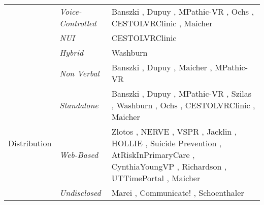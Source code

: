 \begin{table} [t]
{\begin{center}
\begin{tabular}{| p{1.8cm} | p{2cm} | p{8cm} |}
    \cline{2-3}
        & \emph{Voice-Controlled} &  Banszki \cite{banszki2018clinical,quail2016student}, Dupuy \cite{dupuy2019virtual}, MPathic-VR \cite{guetterman2019medical,kron2017using}, Ochs \cite{ochs2019training}, CESTOLVRClinic \cite{sapkaroski2018implementation}, Maicher \cite{maicher2017developing}\\
    \cline{2-3}
        & \emph{NUI} & CESTOLVRClinic \cite{sapkaroski2018implementation}\\
    \cline{2-3}
        & \emph{Hybrid} & Washburn \cite{washburn2020virtual} \\
    \cline{2-3}
        & \emph{Non Verbal} & Banszki \cite{banszki2018clinical,quail2016student}, Dupuy \cite{dupuy2019virtual}, Maicher \cite{maicher2017developing}, MPathic-VR \cite{guetterman2019medical,kron2017using}\\
    \hline
        \multirow{3}{}{Distribution} & \emph{Standalone} & Banszki \cite{banszki2018clinical,quail2016student}, Dupuy \cite{dupuy2019virtual}, MPathic-VR \cite{guetterman2019medical,kron2017using},  Szilas \cite{szilas2019virtual}, Washburn \cite{washburn2020virtual}, Ochs \cite{ochs2019training}, CESTOLVRClinic \cite{sapkaroski2018implementation}, Maicher \cite{maicher2017developing} \\
    \cline{2-3}
        & \emph{Web-Based} & Zlotos \cite{zlotos2016scenario}, NERVE
        \cite{hirumi2016advancingPart2,hirumi2016advancing,kleinsmith2015understanding}, VSPR \cite{peddle2019exploring,peddle2019development}, Jacklin \cite{jacklin2019virtual,jacklin2018improving}, HOLLIE \cite{adefila2020students}, Suicide Prevention \cite{o2019suicide}, AtRiskInPrimaryCare \cite{albright2018using}, CynthiaYoungVP \cite{foster2016using}, Richardson \cite{richardson2019virtual}, UTTimePortal \cite{zielke2016beyond,zielke2016using}, Maicher \cite{maicher2017developing} \\
    \cline{2-3}
         & \emph{Undisclosed} & Marei \cite{marei2018use}, Communicate! \cite{jeuring2015communicate}, Schoenthaler \cite{schoenthaler2017simulated} \\
    \hline
     \end{tabular}
\end{center}
}
\end{table}
\normalsize



